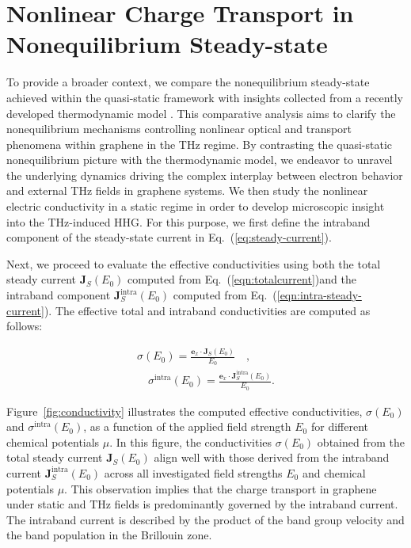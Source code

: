 \section{Nonlinear Charge Transport in Nonequilibrium Steady-state}
To provide a broader context, we compare the nonequilibrium steady-state achieved within the quasi-static framework with insights collected from a recently developed thermodynamic model \cite{mics2015thermodynamic}. This comparative analysis aims to clarify the nonequilibrium mechanisms controlling nonlinear optical and transport phenomena within graphene in the THz regime. By contrasting the quasi-static nonequilibrium picture with the thermodynamic model, we endeavor to unravel the underlying dynamics driving the complex interplay between electron behavior and external THz fields in graphene systems.
We then study the nonlinear electric conductivity in a static regime in order to develop
microscopic insight into the THz-induced HHG. For this purpose, we first define the intraband
component of the steady-state current in Eq.~(\ref{eq:steady-current}).

Next, we proceed to evaluate the effective conductivities using both the total steady current
$\mathbf J_S(E_0)$ computed from Eq.~(\ref{eqn:totalcurrent})and the intraband component $\mathbf J^{\mathrm{intra}}_S(E_0)$ computed from Eq.~(\ref{eqn:intra-steady-current}). The effective total
and intraband conductivities are computed as follows:

\begin{align}
	\sigma(E_0)=\frac{\mathbf e_x\cdot \mathbf J_S(E_0)}{E_0} \quad, \\
	\quad \sigma^{\mathrm{intra}}(E_0)=\frac{\mathbf e_x\cdot \mathbf J^{\mathrm{intra}}_S(E_0)}{E_0}.
\end{align}

Figure~\ref{fig:conductivity} illustrates the computed effective conductivities, $\sigma(E_0)$ and $\sigma^{\mathrm{intra}}(E_0)$, as a function of the applied field strength $E_0$ for different chemical potentials $\mu$. In this figure, the conductivities $\sigma(E_0)$ obtained from the total steady current $\mathbf J_S(E_0)$ align well with those derived from the intraband current $ \mathbf J^{\mathrm{intra}}_S(E_0)$ across all investigated field strengths $E_0$ and chemical potentials $\mu$. This observation implies that the charge transport in graphene under static and THz fields is predominantly governed by the intraband current. The intraband current is described by the product of the band group velocity and the band population in the Brillouin zone.


